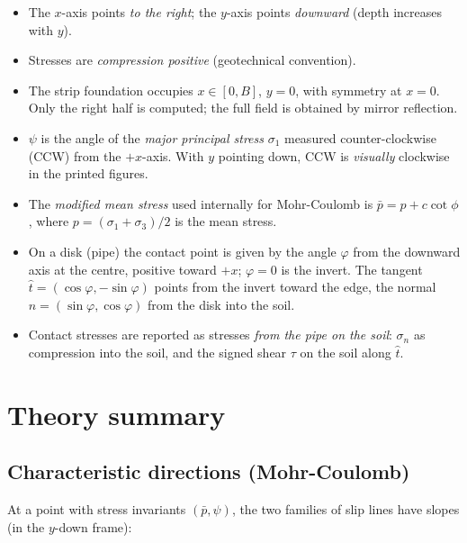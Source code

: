 \documentclass[11pt,a4paper]{article}
\newcommand{\pbar}{\bar{p}}
\begin{document}
\begin{itemize}
  \item The $x$-axis points \emph{to the right}; the $y$-axis points
        \emph{downward} (depth increases with $y$).
  \item Stresses are \emph{compression positive} (geotechnical
        convention).
  \item The strip foundation occupies $x \in [0,B]$, $y = 0$, with
        symmetry at $x=0$.  Only the right half is computed; the full
        field is obtained by mirror reflection.
  \item $\psi$ is the angle of the \emph{major principal stress}
        $\sigma_1$ measured counter-clockwise (CCW) from the
        $+x$-axis.  With $y$ pointing down, CCW is \emph{visually}
        clockwise in the printed figures.
  \item The \emph{modified mean stress} used internally for
        Mohr-Coulomb is
        $\pbar = p + c\cot\phi$,
        where $p = (\sigma_1+\sigma_3)/2$ is the mean stress.
  \item On a disk (pipe) the contact point is given by the angle
        $\varphi$ from the downward axis at the centre, positive
        toward $+x$; $\varphi = 0$ is the invert.  The tangent
        $\hat t = (\cos\varphi, -\sin\varphi)$ points from the invert
        toward the edge, the normal
        $\hat n = (\sin\varphi, \cos\varphi)$ from the disk into the
        soil.
  \item Contact stresses are reported as stresses \emph{from the pipe
        on the soil}: $\sigma_n$ as compression into the soil, and the
        signed shear $\tau$ on the soil along $\hat t$.
\end{itemize}

\section{Theory summary}
\label{sec:theory}

\subsection{Characteristic directions (Mohr-Coulomb)}

At a point with stress invariants $(\pbar, \psi)$, the two families of
slip lines have slopes (in the $y$-down frame):
\end{document}
